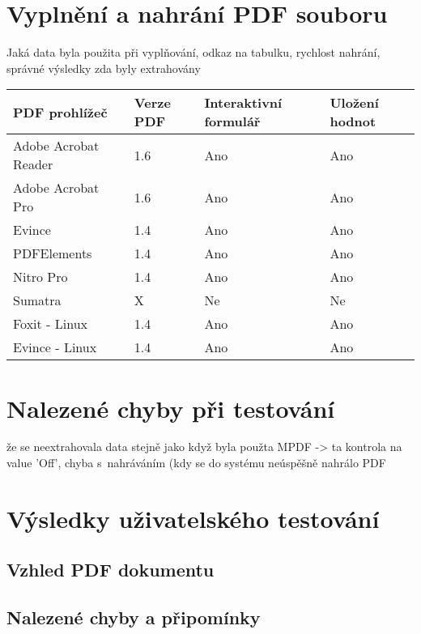 \section{Vyplnění a nahrání PDF souboru}
Jaká data byla použita při vyplňování, odkaz na tabulku, rychlost nahrání, správné výsledky zda byly extrahovány

\begin{table}[h!]
\centering
\begin{tabular}{|l|l|l|l|} 
\hline
\textbf{PDF prohlížeč} & \textbf{Verze PDF} & \textbf{Interaktivní formulář} & \textbf{Uložení hodnot}  \\ 
\hline
Adobe Acrobat Reader   & 1.6                & Ano                            & Ano                      \\ 
\hline
Adobe Acrobat Pro      & 1.6                & Ano                            & Ano                      \\ 
\hline
Evince                 & 1.4                & Ano                            & Ano                      \\ 
\hline
PDFElements            & 1.4                & Ano                            & Ano                      \\ 
\hline
Nitro Pro              & 1.4                & Ano                            & Ano                      \\ 
\hline
Sumatra                & X                  & Ne                             & Ne                       \\ 
\hline
Foxit - Linux          & 1.4                & Ano                            & Ano                      \\ 
\hline
Evince - Linux         & 1.4                & Ano                            & Ano                      \\
\hline
\end{tabular}
\end{table}

\section{Nalezené chyby při testování}
že se neextrahovala data stejně jako když byla použta MPDF -> ta kontrola na value 'Off', chyba s~nahráváním (kdy se do systému neúspěšně nahrálo PDF

\section{Výsledky uživatelského testování}
\subsection{Vzhled PDF dokumentu}
\subsection{Nalezené chyby a připomínky}
 